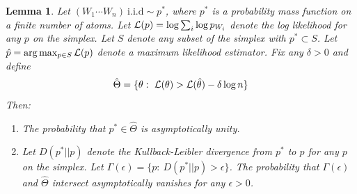 \documentclass{article}
\newtheorem{lemma}[thm]{Lemma}
\theoremstyle{definition}
\begin{document}
\begin{lemma}  \label{lem:sqrtset} Let $(W_1 \cdots W_n)\ \mathrm{i.i.d} \sim p^*$, where $p^*$ is a probability mass function on a finite number of atoms.  Let $\mathcal{L}(p)=\log\sum_i \log p_{W_i}$ denote the log likelihood for any $p$ on the simplex.  Let $S$ denote any subset of the simplex with $p^* \subset S$.  Let $\hat p = \arg \max_{p \in S} \mathcal{L}(p)$ denote a maximum likelihood estimator.  Fix any $\delta>0$ and define 
\[
\hat \Theta = \{\theta :\ \LL(\theta) > \LL(\hat \theta) - \delta \log n\}
\]
Then:
\begin{enumerate}
    \item The probability that $p^* \in \hat \Theta$ is asymptotically unity.
    \item Let $D(p^*||p)$ denote the Kullback-Leibler divergence from $p^*$ to $p$ for any $p$ on the simplex.  Let $\Gamma(\epsilon)= \{p:\ D(p^*||p)>\epsilon\}$.  The probability that $\Gamma(\epsilon)$ and $\hat \Theta$ intersect asymptotically vanishes for any $\epsilon>0$.
\end{enumerate}
\end{lemma}
\end{document}
